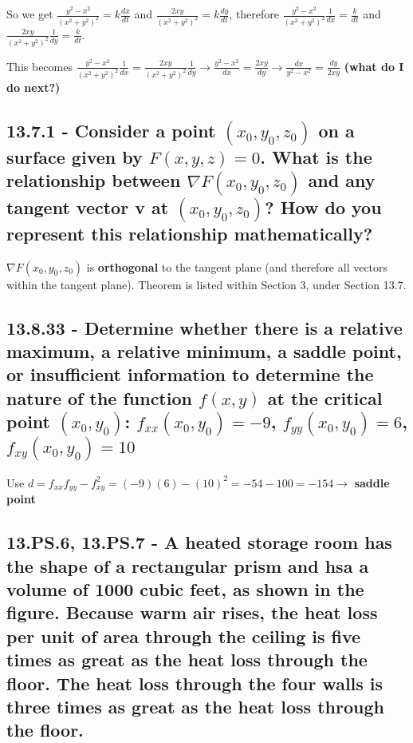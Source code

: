 \documentclass{article}
\begin{document}
\par\noindent\Large So we get $\frac{y^{2} - x^{2}}{(x^{2} + y^{2})^{2}} = k\frac{dx}{dt}$ and $\frac{2xy}{(x^{2} + y^{2})^{2}}= k\frac{dy}{dt}$, therefore $\frac{y^{2} - x^{2}}{(x^{2} + y^{2})^{2}}\frac{1}{dx} = \frac{k}{dt}$ and $\frac{2xy}{(x^{2} + y^{2})^{2}}\frac{1}{dy} = \frac{k}{dt}$.
\par\noindent\Large This becomes $\frac{y^{2} - x^{2}}{(x^{2} + y^{2})^{2}}\frac{1}{dx} = \frac{2xy}{(x^{2} + y^{2})^{2}}\frac{1}{dy} \rightarrow \frac{y^{2} - x^{2}}{dx} = \frac{2xy}{dy} \rightarrow \frac{dx}{y^{2} - x^{2}} = \frac{dy}{2xy}$ \textbf{(what do I do next?)}

\subsection{13.7.1 - Consider a point $(x_{0}, y_{0}, z_{0})$ on a surface given by $F(x, y, z) = 0$.  What is the relationship between $\nabla F(x_{0}, y_{0}, z_{0})$ and any tangent vector \textbf{v} at $(x_{0}, y_{0}, z_{0})$?  How do you represent this relationship mathematically?}

\par\noindent\large $\nabla F(x_{0}, y_{0}, z_{0})$ is \textbf{orthogonal} to the tangent plane (and therefore all vectors within the tangent plane).  Theorem is listed within Section 3, under Section 13.7.

\subsection{13.8.33 - Determine whether there is a relative maximum, a relative minimum, a saddle point, or insufficient information to determine the nature of the function $f(x, y)$ at the critical point $(x_{0}, y_{0})$: $f_{xx}(x_{0}, y_{0}) = -9$, $f_{yy}(x_{0}, y_{0}) = 6$, $f_{xy}(x_{0}, y_{0}) = 10$ }

\par\noindent\large Use $d = f_{xx}f_{yy} - f_{xy}^{2} = (-9)(6) - (10)^{2} = -54 - 100 = -154 \rightarrow$ \textbf{saddle point}

\subsection{13.PS.6, 13.PS.7 - A heated storage room has the shape of a rectangular prism and hsa a volume of 1000 cubic feet, as shown in the figure.  Because warm air rises, the heat loss per unit of area through the ceiling is five times as great as the heat loss through the floor.  The heat loss through the four walls is three times as great as the heat loss through the floor.}
\end{document}
